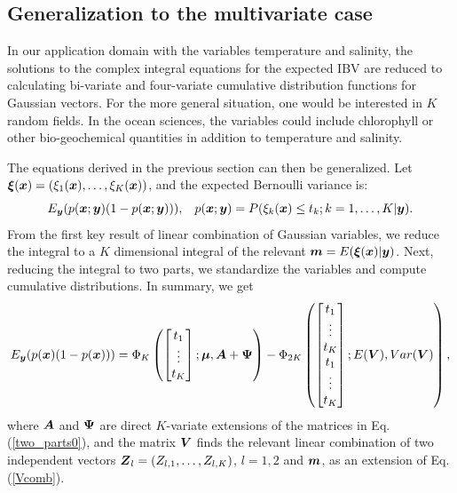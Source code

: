 \documentclass[aoas]{imsart}
\begin{document}
\subsection{Generalization to the multivariate case}
\label{gen_k}

In our application domain with the variables temperature and salinity,
the solutions to the complex integral equations for the expected IBV
are reduced to calculating bi-variate and four-variate cumulative
distribution functions for Gaussian vectors. For the more general
situation, one would be interested in $K$ random fields. In the
ocean sciences, the variables could include chlorophyll or other
bio-geochemical quantities in addition to temperature and salinity.

The equations derived in the previous section can then be generalized. Let
${\boldsymbol \xi}({\boldsymbol x})=(\xi_1({\boldsymbol x}),\ldots,\xi_K({\boldsymbol x}))$, and the expected Bernoulli
variance is:
\begin{equation}\label{two_partsK}
E_{\by}(p(\bx;\by)(1-p(\bx;\by))), \hspace{3mm} p(\bx;\by)=P(\xi_k(\bx) \leq t_k ; k=1,\ldots,K|\by). 
\end{equation}
From the first key result of linear combination of Gaussian variables,
we reduce the integral to a $K$ dimensional integral of the relevant
${\boldsymbol m}=E({\boldsymbol \xi}({\boldsymbol x})|{\boldsymbol y})$. Next, reducing the integral to two parts, we
standardize the variables and compute cumulative distributions.  In
summary, we get
\begin{equation}\label{two_parts}
E_{\by}(p(\bx)(1-p(\bx))) =  \Phi_K 
\begin{pmatrix}
\begin{bmatrix} t_1\\
\vdots \\
t_K 
\end{bmatrix};
\bmu,\bA+\bPsi 
\end{pmatrix}
- \Phi_{2K} 
\begin{pmatrix}
\begin{bmatrix} t_1\\
\vdots \\
t_K \\
t_1\\
\vdots \\
t_K 
\end{bmatrix};
E(\bV),Var(\bV) 
\end{pmatrix},\nonumber
\end{equation}
where ${\boldsymbol A}$ and ${\boldsymbol \Psi}$ are direct $K$-variate extensions of the
matrices in Eq. (\ref{two_parts0}), and the matrix ${\boldsymbol V}$ finds the
relevant linear combination of two independent vectors
${\boldsymbol Z}_l=(Z_{l,1},\ldots,Z_{l,K})$, $l=1,2$ and ${\boldsymbol m}$, as an extension
of Eq. (\ref{Vcomb}).
\end{document}
